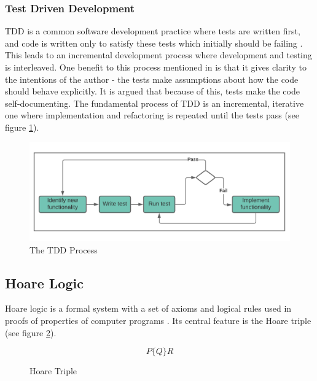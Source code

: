 \subsubsection{Test Driven Development}

TDD is a common software development practice where tests are written first, and code is written only to satisfy these tests which initially should be failing \cite{TESTDRIVEN}. This leads to an incremental development process where development and testing is interleaved. One benefit to this process mentioned in \cite{sommerville_software_2011} is that it gives clarity to the intentions of the author - the tests make assumptions about how the code should behave explicitly. It is argued that because of this, tests make the code self-documenting. The fundamental process of TDD is an incremental, iterative one where implementation and refactoring is repeated until the tests pass \cite{sommerville_software_2011} (see figure \ref{fig:testdriven}).

\begin{figure}[H]
 \vspace{12pt}
\centerline{\includegraphics[width=4.8in]{TestDriven.png}}
\caption{The TDD Process}
\label{fig:testdriven}
\end{figure}

\subsection{Hoare Logic}\label{hoare}

Hoare logic is a formal system with a set of axioms and logical rules used in proofs of properties of computer programs \cite{HOARE}. Its central feature is the Hoare triple (see figure \ref{fig:hoaretriple}).

\begin{figure}[H]
 \vspace{12pt}
\begin{displaymath}
            P\{Q\}R   
\end{displaymath}
\caption{Hoare Triple}
\label{fig:hoaretriple}
\end{figure}

